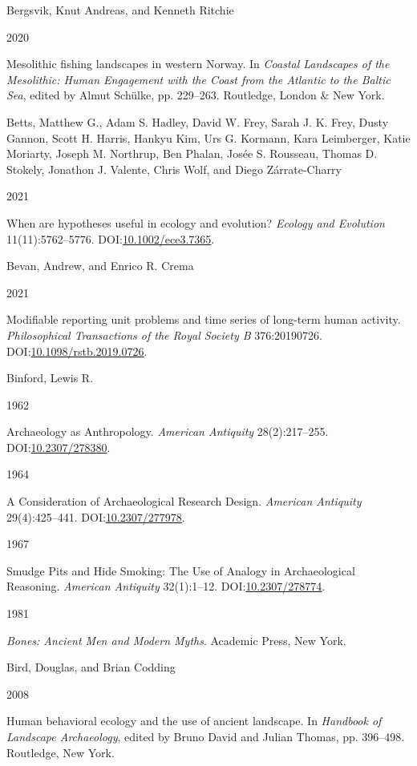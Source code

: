\documentclass[
  a4paper,
  oneside]{uiophdthesis}
\newlength{\cslhangindent}
\newlength{\csllabelwidth}
\newlength{\cslentryspacingunit} %
\newenvironment{CSLReferences}[2] %
 {%
  \setlength{\parindent}{0pt}
  \ifodd #1
  \let\oldpar\par
  \def\par{\hangindent=\cslhangindent\oldpar}
  \fi
  \setlength{\parskip}{#2\cslentryspacingunit}
 }%
 {}
\newcommand{\CSLBlock}[1]{#1\hfill\break}
\newcommand{\CSLLeftMargin}[1]{\parbox[t]{\csllabelwidth}{#1}}
\newcommand{\CSLRightInline}[1]{\parbox[t]{\linewidth - \csllabelwidth}{#1}\break}
\begin{document}
\begin{CSLReferences}{0}{0}
\leavevmode{}%
\CSLBlock{Bergsvik, Knut Andreas, and Kenneth Ritchie}
\CSLLeftMargin{ 2020}
\CSLRightInline{{Mesolithic fishing landscapes in western Norway}. In \emph{{Coastal Landscapes of the Mesolithic: Human Engagement with the Coast from the Atlantic to the Baltic Sea}}, edited by Almut Schülke, pp. 229--263. Routledge, London \& New York.}

\leavevmode{}%
\CSLBlock{Betts, Matthew G., Adam S. Hadley, David W. Frey, Sarah J. K. Frey, Dusty Gannon, Scott H. Harris, Hankyu Kim, Urs G. Kormann, Kara Leimberger, Katie Moriarty, Joseph M. Northrup, Ben Phalan, Josée S. Rousseau, Thomas D. Stokely, Jonathon J. Valente, Chris Wolf, and Diego Zárrate-Charry}
\CSLLeftMargin{ 2021}
\CSLRightInline{{When are hypotheses useful in ecology and evolution?} \emph{Ecology and Evolution} 11(11):5762--5776. DOI:\href{https://doi.org/10.1002/ece3.7365}{10.1002/ece3.7365}.}

\leavevmode{}%
\CSLBlock{Bevan, Andrew, and Enrico R. Crema}
\CSLLeftMargin{ 2021}
\CSLRightInline{Modifiable reporting unit problems and time series of long-term human activity. \emph{Philosophical Transactions of the Royal Society B} 376:20190726. DOI:\href{https://doi.org/10.1098/rstb.2019.0726}{10.1098/rstb.2019.0726}.}

\leavevmode{}%
\CSLBlock{Binford, Lewis R.}
\CSLLeftMargin{ 1962}
\CSLRightInline{Archaeology as Anthropology. \emph{American Antiquity} 28(2):217--255. DOI:\href{https://doi.org/10.2307/278380}{10.2307/278380}.}

\leavevmode{}%
\CSLLeftMargin{ 1964 }
\CSLRightInline{{A Consideration of Archaeological Research Design}. \emph{American Antiquity} 29(4):425--441. DOI:\href{https://doi.org/10.2307/277978}{10.2307/277978}.}

\leavevmode{}%
\CSLLeftMargin{ 1967 }
\CSLRightInline{{Smudge Pits and Hide Smoking: The Use of Analogy in Archaeological Reasoning}. \emph{American Antiquity} 32(1):1--12. DOI:\href{https://doi.org/10.2307/278774}{10.2307/278774}.}

\leavevmode{}%
\CSLLeftMargin{ 1981 }
\CSLRightInline{\emph{{Bones: Ancient Men and Modern Myths}}. Academic Press, New York.}

\leavevmode{}%
\CSLBlock{Bird, Douglas, and Brian Codding}
\CSLLeftMargin{ 2008}
\CSLRightInline{{Human behavioral ecology and the use of ancient landscape}. In \emph{{Handbook of Landscape Archaeology}}, edited by Bruno David and Julian Thomas, pp. 396--498. Routledge, New York.}


\end{CSLReferences}
\end{document}
